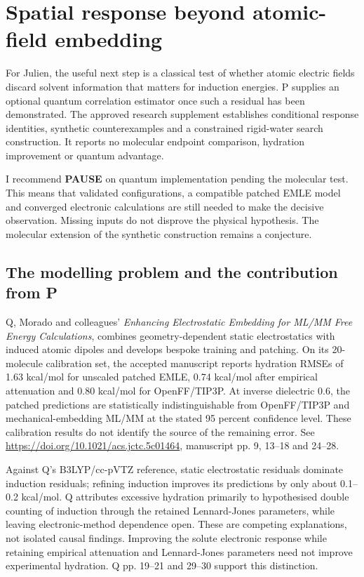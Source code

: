 \documentclass{article}
\date{}
\begin{document}
\section{Spatial response beyond atomic-field embedding}

For Julien, the useful next step is a classical test of whether atomic electric fields discard solvent information that matters for induction energies. P supplies an optional quantum correlation estimator once such a residual has been demonstrated. The approved research supplement establishes conditional response identities, synthetic counterexamples and a constrained rigid-water search construction. It reports no molecular endpoint comparison, hydration improvement or quantum advantage.

I recommend \textbf{PAUSE} on quantum implementation pending the molecular test. This means that validated configurations, a compatible patched EMLE model and converged electronic calculations are still needed to make the decisive observation. Missing inputs do not disprove the physical hypothesis. The molecular extension of the synthetic construction remains a conjecture.

\subsection{The modelling problem and the contribution from P}

Q, Morado and colleagues' \emph{Enhancing Electrostatic Embedding for ML/MM Free Energy Calculations}, combines geometry-dependent static electrostatics with induced atomic dipoles and develops bespoke training and patching. On its 20-molecule calibration set, the accepted manuscript reports hydration RMSEs of 1.63 kcal/mol for unscaled patched EMLE, 0.74 kcal/mol after empirical attenuation and 0.80 kcal/mol for OpenFF/TIP3P. At inverse dielectric 0.6, the patched predictions are statistically indistinguishable from OpenFF/TIP3P and mechanical-embedding ML/MM at the stated 95 percent confidence level. These calibration results do not identify the source of the remaining error. See \url{https://doi.org/10.1021/acs.jctc.5c01464}, manuscript pp. 9, 13--18 and 24--28.

Against Q's B3LYP/cc-pVTZ reference, static electrostatic residuals dominate induction residuals; refining induction improves its predictions by only about 0.1--0.2 kcal/mol. Q attributes excessive hydration primarily to hypothesised double counting of induction through the retained Lennard-Jones parameters, while leaving electronic-method dependence open. These are competing explanations, not isolated causal findings. Improving the solute electronic response while retaining empirical attenuation and Lennard-Jones parameters need not improve experimental hydration. Q pp. 19--21 and 29--30 support this distinction.
\end{document}
